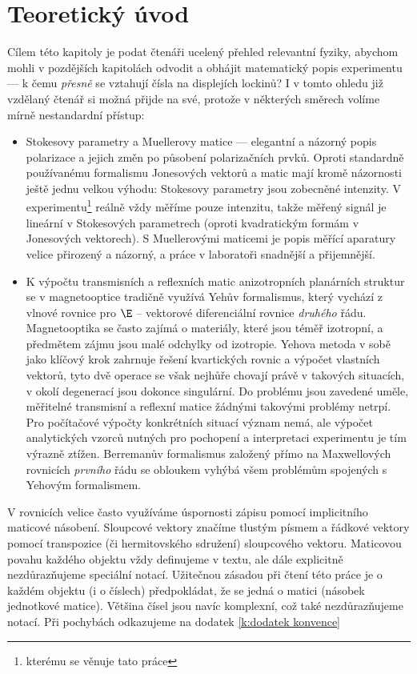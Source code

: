 \chapter{Teoretický úvod} \label{k:teorie}

Cílem této kapitoly je podat čtenáři ucelený přehled relevantní fyziky, abychom mohli v pozdějších kapitolách odvodit a obhájit matematický popis experimentu --- k čemu \emph{přesně} se vztahují čísla na displejích lockinů?
I v tomto ohledu již vzdělaný čtenář si možná přijde na své, protože v některých směrech volíme mírně nestandardní přístup:
\begin{itemize}
\item
Stokesovy parametry a Muellerovy matice --- elegantní a názorný popis polarizace a jejich změn po působení polarizačních prvků.
Oproti standardně používanému formalismu Jonesových vektorů a matic mají kromě názornosti ještě jednu velkou výhodu: Stokesovy parametry jsou zobecněné intenzity.
V experimentu\footnote{kterému se věnuje tato práce} reálně vždy měříme pouze intenzitu, takže měřený signál je lineární v Stokesových parametrech (oproti kvadratickým formám v Jonesových vektorech).
S Muellerovými maticemi je popis měřící aparatury velice přirozený a názorný, a práce v laboratoři snadnější a přijemnější.
\item
K výpočtu transmisních a reflexních matic anizotropních planárních struktur se v magnetooptice tradičně\cite{Berremanperturb} využívá Yehův formalismus\cite{Yeh}, který vychází z vlnové rovnice pro $\E$ -- vektorové diferenciální rovnice \emph{druhého} řádu. 
Magnetooptika se často zajímá o materiály, které jsou téměř izotropní, a předmětem zájmu jsou malé odchylky od izotropie. 
Yehova metoda v sobě jako klíčový krok zahrnuje řešení kvartických rovnic a výpočet vlastních vektorů, tyto dvě operace se však nejhůře chovají právě v takových situacích, v okolí degenerací jsou dokonce singulární\cite{Yehsing1}.
Do problému jsou zavedené uměle, měřitelné transmisní a reflexní matice žádnými takovými problémy netrpí.
Pro počítačové výpočty konkrétních situací význam nemá, ale výpočet analytických vzorců nutných pro pochopení a interpretaci experimentu je tím výrazně ztížen\cite{Vispolar}.
Berremanův formalismus založený přímo na Maxwellových rovnicích \emph{prvního} řádu se obloukem vyhýbá všem problémům spojených s Yehovým formalismem.
\end{itemize}

V rovnicích velice často využíváme úspornosti zápisu pomocí implicitního maticové násobení. 
Sloupcové vektory značíme tlustým písmem a řádkové vektory pomocí transpozice (či hermitovského sdružení) sloupcového vektoru.
Maticovou povahu každého objektu vždy definujeme v textu, ale dále explicitně nezdůrazňujeme speciální notací. 
Užitečnou zásadou při čtení této práce je o každém objektu (i o číslech) předpokládat, že se jedná o matici (násobek jednotkové matice).
Většina čísel jsou navíc komplexní, což také nezdůrazňujeme notací.
Při pochybách odkazujeme na dodatek \ref{k:dodatek konvence}

